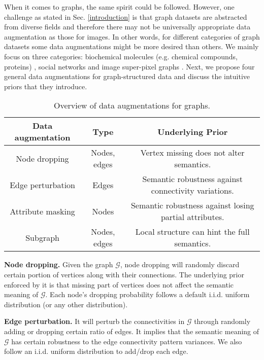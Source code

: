 When it comes to graphs, the same spirit could be followed. However, one challenge as stated in Sec. \ref{introduction} is that graph datasets are abstracted from diverse fields 
and therefore there may not be universally appropriate data augmentation as those for  images.
In other words, for different categories of graph datasets some data augmentations might be more desired than others. 
We mainly focus on three categories:
biochemical molecules (e.g. chemical compounds, proteins) \cite{hu2019pre}, social networks \cite{kipf2016semi} and image super-pixel graphs \cite{dwivedi2020benchmarking}. Next, we propose four general data augmentations for graph-structured data and discuss the intuitive 
priors that they introduce.
\begin{table}[ht] \vspace{-1em}
\scriptsize
 \caption{Overview of data augmentations for graphs.
 }
 \label{tab:data_augmentation}
 \centering
 \begin{tabular}{c | c | c} 
  \hline
  \hline
  \textbf{Data augmentation} & \textbf{Type} & \textbf{Underlying Prior} \\
  \hline
  \hline
  Node dropping & Nodes, edges & Vertex missing does not alter semantics. \\
  \hline
  Edge perturbation & Edges & Semantic robustness against connectivity variations. \\
  \hline
  Attribute masking & Nodes & Semantic robustness against losing partial attributes. \\
  \hline
  Subgraph & Nodes, edges & Local structure can hint the full semantics. \\
  \hline
  \hline
 \end{tabular} %
\end{table}

\textbf{Node dropping.}
Given the graph $\mathcal{G}$, node dropping will randomly discard certain portion of vertices along with their connections.
The underlying prior enforced by it is that missing part of vertices does not affect the semantic meaning of $\mathcal{G}$. Each node's dropping probability follows a default i.i.d. uniform distribution (or any other distribution).  

\textbf{Edge perturbation.}
It will perturb the connectivities in $\mathcal{G}$ through randomly adding or dropping certain ratio of edges.
It implies that the semantic meaning of $\mathcal{G}$ has certain robustness to the edge connectivity pattern variances. We also follow an i.i.d. uniform distribution to add/drop each edge.

